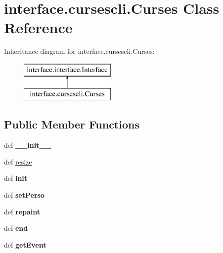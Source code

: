 \hypertarget{classinterface_1_1cursescli_1_1_curses}{\section{interface.\-cursescli.\-Curses \-Class \-Reference}
\label{classinterface_1_1cursescli_1_1_curses}
}
\-Inheritance diagram for interface.\-cursescli.\-Curses\-:\begin{figure}[H]
\begin{center}
\leavevmode
\includegraphics[height=2.000000cm]{classinterface_1_1cursescli_1_1_curses}
\end{center}
\end{figure}
\subsection*{\-Public \-Member \-Functions}
\begin{DoxyCompactItemize}
\item 
\hypertarget{classinterface_1_1cursescli_1_1_curses_a192eb6300c83226e1b98e4d7a5bc9561}{def {\bfseries \-\_\-\-\_\-init\-\_\-\-\_\-}}\label{classinterface_1_1cursescli_1_1_curses_a192eb6300c83226e1b98e4d7a5bc9561}

\item 
def \hyperlink{classinterface_1_1cursescli_1_1_curses_ab2b4383b3add0916dfce994865013c12}{resize}
\item 
\hypertarget{classinterface_1_1cursescli_1_1_curses_a6ab69ed1b7afdc9d1d0f7e74ed6623cd}{def {\bfseries init}}\label{classinterface_1_1cursescli_1_1_curses_a6ab69ed1b7afdc9d1d0f7e74ed6623cd}

\item 
\hypertarget{classinterface_1_1cursescli_1_1_curses_a003586d92839ef7c13b164829e5ea5a4}{def {\bfseries set\-Perso}}\label{classinterface_1_1cursescli_1_1_curses_a003586d92839ef7c13b164829e5ea5a4}

\item 
\hypertarget{classinterface_1_1cursescli_1_1_curses_a03c24991bdaf625425fcdc00a31dd880}{def {\bfseries repaint}}\label{classinterface_1_1cursescli_1_1_curses_a03c24991bdaf625425fcdc00a31dd880}

\item 
\hypertarget{classinterface_1_1cursescli_1_1_curses_ae94215f68f2e77264bcd8b2338cd9bd6}{def {\bfseries end}}\label{classinterface_1_1cursescli_1_1_curses_ae94215f68f2e77264bcd8b2338cd9bd6}

\item 
\hypertarget{classinterface_1_1cursescli_1_1_curses_a80b940406bbf923b5deff0fe6c35f4d4}{def {\bfseries get\-Event}}\label{classinterface_1_1cursescli_1_1_curses_a80b940406bbf923b5deff0fe6c35f4d4}

\end{DoxyCompactItemize}
